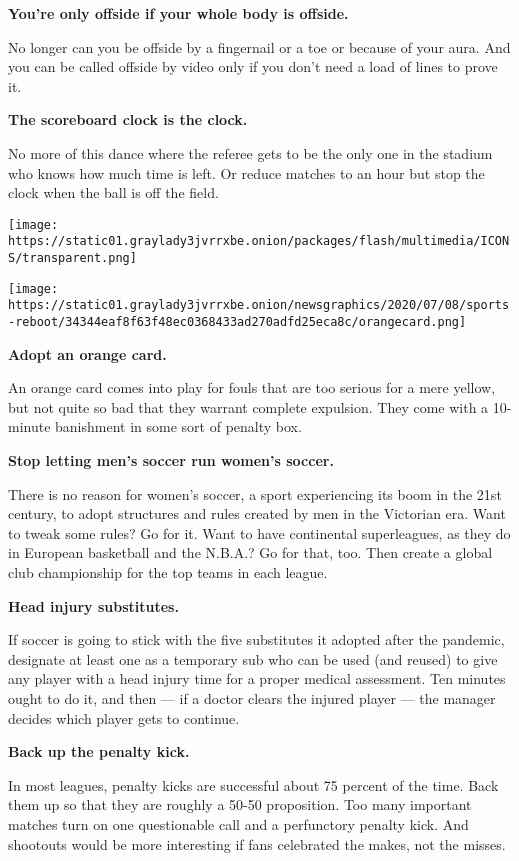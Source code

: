 \textbf{You're only offside if your whole body is offside.}

No longer can you be offside by a fingernail or a toe or because of your
aura. And you can be called offside by video only if you don't need a
load of lines to prove it.

\textbf{The scoreboard clock is the clock.}

No more of this dance where the referee gets to be the only one in the
stadium who knows how much time is left. Or reduce matches to an hour
but stop the clock when the ball is off the field.

\texttt{[image: https://static01.graylady3jvrrxbe.onion/packages/flash/multimedia/ICONS/transparent.png]}

\texttt{[image: https://static01.graylady3jvrrxbe.onion/newsgraphics/2020/07/08/sports-reboot/34344eaf8f63f48ec0368433ad270adfd25eca8c/orangecard.png]}

\textbf{Adopt an orange card.}

An orange card comes into play for fouls that are too serious for a mere
yellow, but not quite so bad that they warrant complete expulsion. They
come with a 10-minute banishment in some sort of penalty box.

\textbf{Stop letting men's soccer run women's soccer.}

There is no reason for women's soccer, a sport experiencing its boom in
the 21st century, to adopt structures and rules created by men in the
Victorian era. Want to tweak some rules? Go for it. Want to have
continental superleagues, as they do in European basketball and the
N.B.A.? Go for that, too. Then create a global club championship for the
top teams in each league.

\textbf{Head injury substitutes.}

If soccer is going to stick with the five substitutes it adopted after
the pandemic, designate at least one as a temporary sub who can be used
(and reused) to give any player with a head injury time for a proper
medical assessment. Ten minutes ought to do it, and then --- if a doctor
clears the injured player --- the manager decides which player gets to
continue.

\textbf{Back up the penalty kick.}

In most leagues, penalty kicks are successful about 75 percent of the
time. Back them up so that they are roughly a 50-50 proposition. Too
many important matches turn on one questionable call and a perfunctory
penalty kick. And shootouts would be more interesting if fans celebrated
the makes, not the misses.

